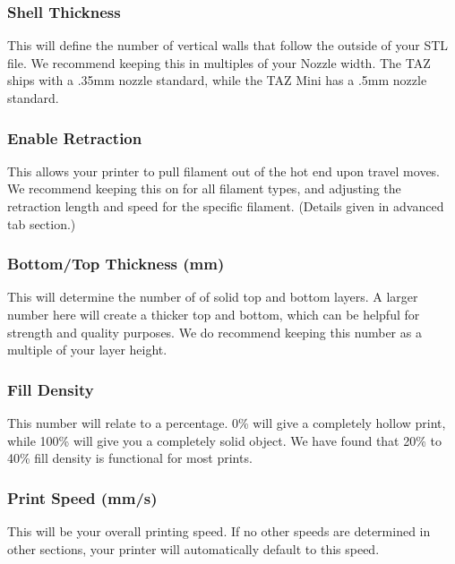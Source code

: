 \subsubsection{Shell Thickness}

This will define the number of vertical walls that follow the outside of your STL file. We recommend keeping this in multiples of your Nozzle width. The TAZ ships with a .35mm nozzle standard, while the TAZ Mini has a .5mm nozzle standard.

\subsubsection{Enable Retraction}

This allows your printer to pull filament out of the hot end upon travel moves. We recommend keeping this on for all filament types, and adjusting the retraction length and speed for the specific filament. (Details given in advanced tab section.)

\subsubsection{Bottom/Top Thickness (mm)}

This will determine the number of of solid top and bottom layers. A larger number here will create a thicker top and bottom, which can be helpful for strength and quality purposes. We do recommend keeping this number as a multiple of your layer height.

\subsubsection{Fill Density}

This number will relate to a percentage. 0\% will give a completely hollow print, while 100\% will give you a completely solid object. We have found that 20\% to 40\% fill density is functional for most prints.

\subsubsection{Print Speed (mm/s)}

This will be your overall printing speed. If no other speeds are determined 	in other sections, your printer will automatically default to this speed. 

